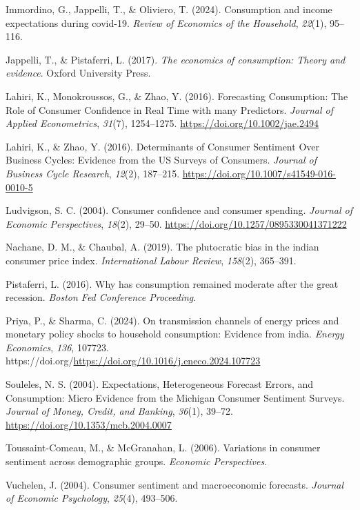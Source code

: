 \documentclass[
  abstract]{scrartcl}
\newlength{\cslhangindent}
\newenvironment{CSLReferences}[2] %
 {\begin{list}{}{%
  \setlength{\itemindent}{0pt}
  \setlength{\leftmargin}{0pt}
  \setlength{\parsep}{0pt}
  \ifodd #1
   \setlength{\leftmargin}{\cslhangindent}
   \setlength{\itemindent}{-1\cslhangindent}
  \fi
  \setlength{\itemsep}{#2\baselineskip}}}
 {\end{list}}
\begin{document}
\begin{CSLReferences}{1}{0}
Immordino, G., Jappelli, T., \& Oliviero, T. (2024). Consumption and
income expectations during covid-19. \emph{Review of Economics of the
Household}, \emph{22}(1), 95--116.

Jappelli, T., \& Pistaferri, L. (2017). \emph{The economics of
consumption: Theory and evidence}. Oxford University Press.

Lahiri, K., Monokroussos, G., \& Zhao, Y. (2016). Forecasting
{Consumption}: The {Role} of {Consumer} {Confidence} in {Real} {Time}
with many {Predictors}. \emph{Journal of Applied Econometrics},
\emph{31}(7), 1254--1275. \url{https://doi.org/10.1002/jae.2494}

Lahiri, K., \& Zhao, Y. (2016). Determinants of {Consumer} {Sentiment}
{Over} {Business} {Cycles}: {Evidence} from the {US} {Surveys} of
{Consumers}. \emph{Journal of Business Cycle Research}, \emph{12}(2),
187--215. \url{https://doi.org/10.1007/s41549-016-0010-5}

Ludvigson, S. C. (2004). Consumer confidence and consumer spending.
\emph{Journal of Economic Perspectives}, \emph{18}(2), 29--50.
\url{https://doi.org/10.1257/0895330041371222}

Nachane, D. M., \& Chaubal, A. (2019). The plutocratic bias in the
indian consumer price index. \emph{International Labour Review},
\emph{158}(2), 365--391.

Pistaferri, L. (2016). Why has consumption remained moderate after the
great recession. \emph{Boston Fed Conference Proceeding}.

Priya, P., \& Sharma, C. (2024). On transmission channels of energy
prices and monetary policy shocks to household consumption: Evidence
from india. \emph{Energy Economics}, \emph{136}, 107723.
https://doi.org/\url{https://doi.org/10.1016/j.eneco.2024.107723}

Souleles, N. S. (2004). Expectations, {Heterogeneous} {Forecast}
{Errors}, and {Consumption}: {Micro} {Evidence} from the {Michigan}
{Consumer} {Sentiment} {Surveys}. \emph{Journal of Money, Credit, and
Banking}, \emph{36}(1), 39--72.
\url{https://doi.org/10.1353/mcb.2004.0007}

Toussaint-Comeau, M., \& McGranahan, L. (2006). Variations in consumer
sentiment across demographic groups. \emph{Economic Perspectives}.

Vuchelen, J. (2004). Consumer sentiment and macroeconomic forecasts.
\emph{Journal of Economic Psychology}, \emph{25}(4), 493--506.

\end{CSLReferences}
\end{document}
